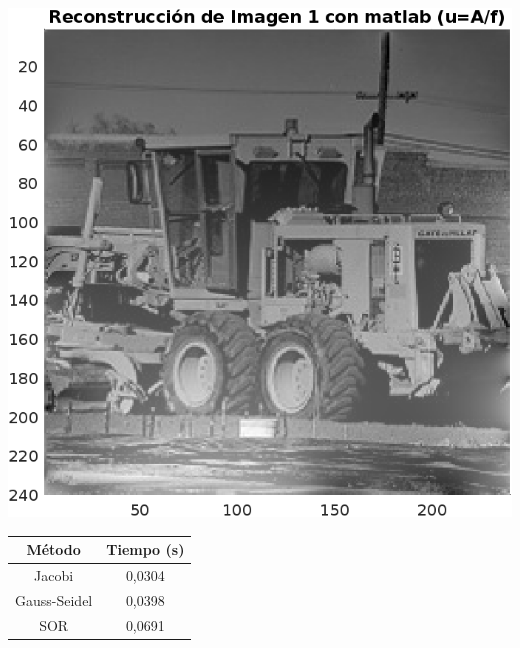 \begin{homeworkProblem}
\begin{solucion}
\begin{center}
      \includegraphics[scale=0.6]{Figures/Figure_1matlab.png}\\
    \end{center}
    \begin{center}
      \begin{tabular}{|c|c|}
        \hline
        Método & Tiempo (s)\\
        \hline
        Jacobi & 0,0304\\
        \hline
        Gauss-Seidel & 0,0398\\
        \hline
        SOR & 0,0691\\
        \hline
      \end{tabular}        
    \end{center}
    \begin{center}

\end{center}
\end{solucion}
\end{homeworkProblem}

